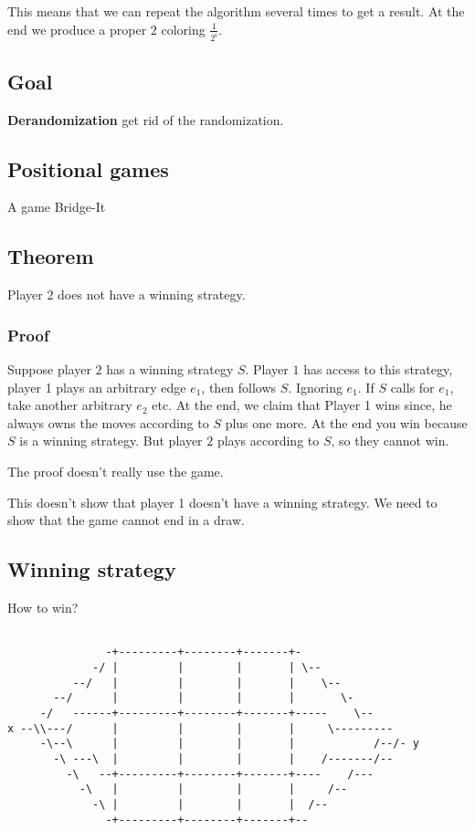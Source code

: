 \documentclass[11pt]{article}
\begin{document}
This means that we can repeat the algorithm several times to get a result. At
the end we produce a proper \(2\) coloring \(\frac{1}{2^i}\).
\subsection{Goal}
\label{sec:orgc6526bc}
\textbf{Derandomization} get rid of the randomization.
\subsection{Positional games}
\label{sec:org9868bf2}
A game Bridge-It
\subsection{Theorem}
\label{sec:orgb748796}
Player 2 does not have a winning strategy.
\subsubsection{Proof}
\label{sec:org80a9433}
Suppose player \(2\) has a winning strategy \(S\). Player \(1\) has access to this
strategy, player 1 plays an arbitrary edge \(e_1\), then follows \(S\). Ignoring
\(e_1\). If \(S\) calls for \(e_1\), take another arbitrary \(e_2\) etc. At the end,
we claim that Player 1 wins since, he always owns the moves according to \(S\)
plus one more. At the end you win because \(S\) is a winning strategy. But
player \(2\) plays according to \(S\), so they cannot win.

The proof doesn't really use the game.

This doesn't show that player 1 doesn't have a winning strategy. We need to
show that the game cannot end in a draw.
\subsection{Winning strategy}
\label{sec:orgea47e71}
How to win?

\begin{verbatim}

               -+---------+--------+-------+-
             -/ |         |        |       | \--
          --/   |         |        |       |    \--
       --/      |         |        |       |       \-
     -/   ------+---------+--------+-------+-----    \--
x --\\---/      |         |        |       |     \---------
     -\--\      |         |        |       |            /--/- y
       -\ ---\  |         |        |       |    /-------/--
         -\   --+---------+--------+-------+----    /---
           -\   |         |        |       |     /--
             -\ |         |        |       |  /--
               -+---------+--------+-------+--
\end{verbatim}
\end{document}
